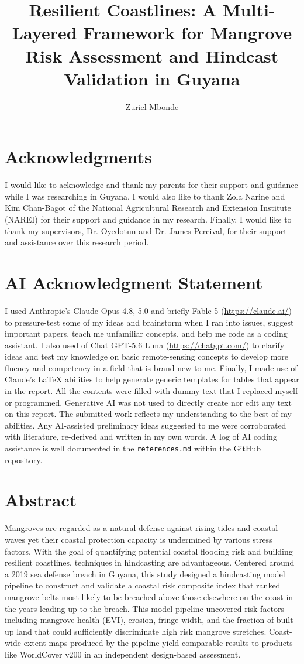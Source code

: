 \documentclass[final-report]{report-template}
\title{Resilient Coastlines: A Multi-Layered Framework for Mangrove Risk Assessment and Hindcast Validation in Guyana}
\author{Zuriel Mbonde}
\begin{document}
\maketitlepage  %

\section*{Acknowledgments}
I would like to acknowledge and thank my parents for their support and guidance while I was researching in Guyana. I would also like to thank Zola Narine and Kim Chan-Bagot of the National Agricultural Research and Extension Institute (NAREI) for their support and guidance in my research. Finally, I would like to thank my supervisors, Dr. Oyedotun and Dr. James Percival, for their support and assistance over this research period. 

\section*{AI Acknowledgment Statement}
I used Anthropic's Claude Opus 4.8, 5.0 and briefly Fable 5 (\url{https://claude.ai/}) to pressure-test some of my ideas and brainstorm when I ran into issues, suggest important papers, teach me unfamiliar concepts, and help me code as a coding assistant. I also used of Chat GPT-5.6 Luna (\url{https://chatgpt.com/}) to clarify ideas and test my knowledge on basic remote-sensing concepts to develop more fluency and competency in a field that is brand new to me. Finally, I made use of Claude's LaTeX abilities to help generate generic templates for tables that appear in the report. All the contents were filled with dummy text that I replaced myself or programmed. Generative AI was not used to directly create nor edit any text on this report. The submitted work reflects my understanding to the best of my abilities. Any AI-assisted preliminary ideas suggested to me were corroborated with literature, re-derived and written in my own words. A log of AI coding assistance is well documented in the \texttt{references.md} within the GitHub repository.

\section*{Abstract}
Mangroves are regarded as a natural defense against rising tides and coastal waves yet their coastal protection capacity is undermined by various stress factors. With the goal of quantifying potential coastal flooding risk and building resilient coastlines, techniques in hindcasting are advantageous. Centered around a 2019 sea defense breach in Guyana,  this study designed a hindcasting model pipeline to construct and validate a coastal risk composite index that ranked mangrove belts most likely to be breached above those elsewhere on the coast in the years leading up to the breach. This model pipeline uncovered risk factors including mangrove health (EVI), erosion, fringe width, and the fraction of built-up land that could sufficiently discriminate high risk mangrove stretches. Coast-wide extent maps produced by the pipeline yield comparable results to products like WorldCover v200 in an independent design-based assessment. 
\clearpage
\tableofcontents
\clearpage
\end{document}
